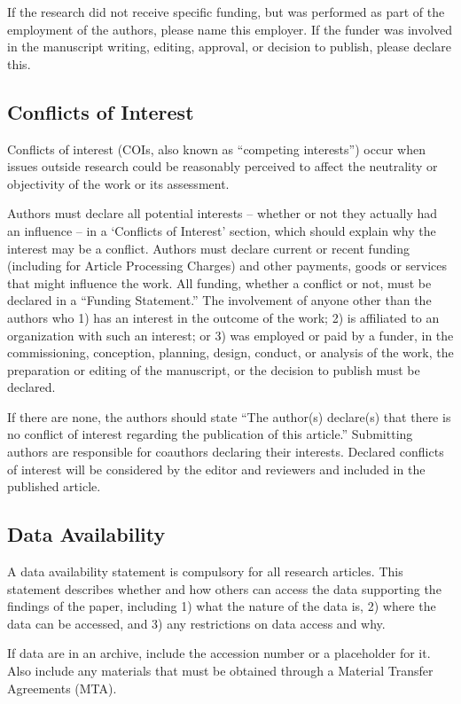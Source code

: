 \documentclass{article}
\begin{document}
\medskip
If the research did not receive specific funding, but was performed as part of the employment of the authors, please name this employer. If the funder was involved in the manuscript writing, editing, approval, or decision to publish, please declare this.

\subsection*{Conflicts of Interest}
Conflicts of interest (COIs, also known as ``competing interests'') occur when issues outside research could be reasonably perceived to affect the neutrality or objectivity of the work or its assessment. 

Authors must declare all potential interests – whether or not they actually had an influence – in a ‘Conflicts of Interest’ section, which should explain why the interest may be a conflict. Authors must declare current or recent funding (including for Article Processing Charges) and other payments, goods or services that might influence the work. All funding, whether a conflict or not, must be declared in a ``Funding Statement.'' The involvement of anyone other than the authors who 1) has an interest in the outcome of the work; 2) is affiliated to an organization with such an interest; or 3) was employed or paid by a funder, in the commissioning, conception, planning, design, conduct, or analysis of the work, the preparation or editing of the manuscript, or the decision to publish must be declared.

If there are none, the authors should state ``The author(s) declare(s) that there is no conflict of interest regarding the publication of this article.'' Submitting authors are responsible for coauthors declaring their interests. Declared conflicts of interest will be considered by the editor and reviewers and included in the published article.

\subsection*{Data Availability}
A data availability statement is compulsory for all research articles. This statement describes whether and how others can access the data supporting the findings of the paper, including 1) what the nature of the data is, 2) where the data can be accessed, and 3) any restrictions on data access and why.

If data are in an archive, include the accession number or a placeholder for it. Also include any materials that must be obtained through a Material Transfer Agreements (MTA). 
\end{document}
